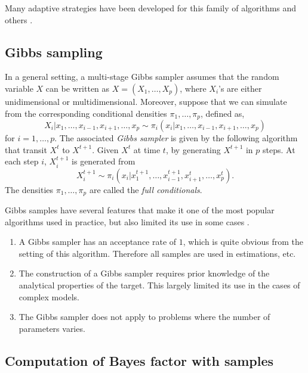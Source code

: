 Many adaptive strategies have been developed for this family of algorithms and
others \parencite[see][for a recent review]{Andrieu:2008kh}.

\subsection{Gibbs sampling}
\label{sub:Gibbs sampling}

In a general setting, a multi-stage Gibbs sampler assumes that the random
variable $X$ can be written as $X = (X_1,\dots,X_p)$, where $X_i$'s are either
unidimensional or multidimensional. Moreover, suppose that we can simulate
from the corresponding conditional densities $\pi_1,\dots,\pi_p$, defined as,
\begin{equation}
  X_i|x_1,\dots,x_{i-1},x_{i+1},\dots,x_p
  \sim \pi_i(x_i|x_1,\dots,x_{i-1},x_{i+1},\dots,x_p)
\end{equation}
for $i = 1,\dots,p$. The associated \emph{Gibbs sampler} is given by the
following algorithm that transit $X^t$ to $X^{t+1}$. Given $X^t$ at time $t$,
by generating $X^{t+1}$ in $p$ steps. At each step $i$, $X_i^{t+1}$ is
generated from
\begin{equation}
  X_i^{t+1} \sim
  \pi_i(x_i|x_1^{t+1},\dots,x_{i-1}^{t+1},x_{i+1}^t,\dots,x_p^t).
\end{equation}
The densities $\pi_1,\dots,\pi_p$ are called the \emph{full conditionals}.

Gibbs samples have several features that make it one of the most popular \mcmc
algorithms used in practice, but also limited its use in some cases
\parencite[see][chap.~10]{Robert:2004tn}.
\begin{enumerate}
  \item A Gibbs sampler has an acceptance rate of $1$, which is quite obvious
    from the setting of this algorithm. Therefore all samples are used in
    estimations, etc.
  \item The construction of a Gibbs sampler requires prior knowledge of the
    analytical properties of the target. This largely limited its use in the
    cases of complex models.
  \item The Gibbs sampler does not apply to problems where the number of
    parameters varies.
\end{enumerate}

\subsection{Computation of Bayes factor with \protect\mcmc samples}
\label{sub:Computation of Bayes factor with mcmc samples}

